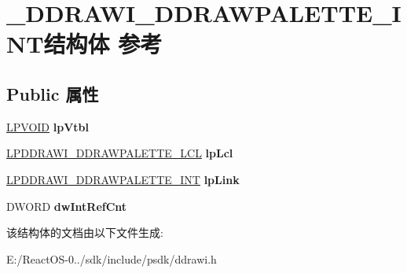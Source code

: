 \hypertarget{struct___d_d_r_a_w_i___d_d_r_a_w_p_a_l_e_t_t_e___i_n_t}{}\section{\+\_\+\+D\+D\+R\+A\+W\+I\+\_\+\+D\+D\+R\+A\+W\+P\+A\+L\+E\+T\+T\+E\+\_\+\+I\+N\+T结构体 参考}
\label{struct___d_d_r_a_w_i___d_d_r_a_w_p_a_l_e_t_t_e___i_n_t}
\subsection*{Public 属性}
\begin{DoxyCompactItemize}
\item 
\mbox{\label{struct___d_d_r_a_w_i___d_d_r_a_w_p_a_l_e_t_t_e___i_n_t_a56e1112ba76f609ad6936908849d01fc}} 
\hyperlink{interfacevoid}{L\+P\+V\+O\+ID} {\bfseries lp\+Vtbl}
\item 
\mbox{\label{struct___d_d_r_a_w_i___d_d_r_a_w_p_a_l_e_t_t_e___i_n_t_a2e0d0acc6f55acc21ffea3372ef6c1fb}} 
\hyperlink{struct___d_d_r_a_w_i___d_d_r_a_w_p_a_l_e_t_t_e___l_c_l}{L\+P\+D\+D\+R\+A\+W\+I\+\_\+\+D\+D\+R\+A\+W\+P\+A\+L\+E\+T\+T\+E\+\_\+\+L\+CL} {\bfseries lp\+Lcl}
\item 
\mbox{\label{struct___d_d_r_a_w_i___d_d_r_a_w_p_a_l_e_t_t_e___i_n_t_a73fa7be2fa6a7de7c50ae3b3ed600a0e}} 
\hyperlink{struct___d_d_r_a_w_i___d_d_r_a_w_p_a_l_e_t_t_e___i_n_t}{L\+P\+D\+D\+R\+A\+W\+I\+\_\+\+D\+D\+R\+A\+W\+P\+A\+L\+E\+T\+T\+E\+\_\+\+I\+NT} {\bfseries lp\+Link}
\item 
\mbox{\label{struct___d_d_r_a_w_i___d_d_r_a_w_p_a_l_e_t_t_e___i_n_t_a5395c32d58bb87280b98f16af538dd07}} 
D\+W\+O\+RD {\bfseries dw\+Int\+Ref\+Cnt}
\end{DoxyCompactItemize}


该结构体的文档由以下文件生成\+:\begin{DoxyCompactItemize}
\item 
E\+:/\+React\+O\+S-\/0../sdk/include/psdk/ddrawi.\+h\end{DoxyCompactItemize}
